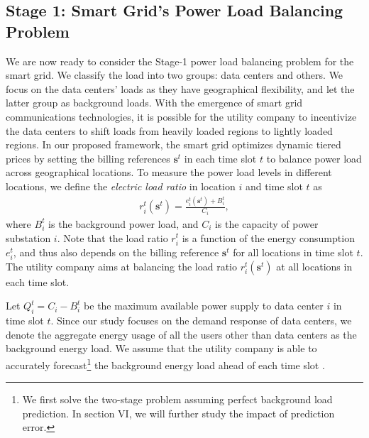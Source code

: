 \documentclass[journal]{IEEEtran}
\begin{document}
	
	
	\subsection{Stage 1: Smart Grid's Power Load Balancing Problem}
	We are now ready to consider the Stage-1 power load balancing problem for the smart grid. We classify the load into two groups: data centers and others. We focus on the data centers' loads as they have geographical flexibility, and let the latter group as background loads. With the emergence of smart grid communications technologies, it is possible for the utility company to incentivize the data centers to shift loads from heavily loaded regions to lightly loaded regions. In our proposed framework, the smart grid optimizes dynamic tiered prices by setting the billing references $\boldsymbol{s}^{t}$ in each time slot $t$ to balance power load across geographical locations. To measure the power load levels in different locations, we define the \emph{electric load ratio} in location $i$ and time slot $t$ as
	\begin{align}\label{loadratio}
		r_{i}^{t}(\boldsymbol{s}^{t}) = \frac{e_{i}^{t}(\boldsymbol{s}^{t}) + B_{i}^{t}} {C_{i}},
	\end{align}
	where $B_{i}^{t}$ is the background power load, and $C_{i}$ is the capacity of power substation $i$. Note that the load ratio $r_{i}^{t}$ is a function of the energy consumption $e_{i}^{t}$, and thus also depends on the billing reference $\boldsymbol{s}^{t}$ for all locations in time slot $t$. The utility company aims at balancing the load ratio $r_{i}^{t}(\boldsymbol{s}^{t})$ at all locations in each time slot.
	
	Let $Q_{i}^{t} = C_{i} - B_{i}^{t}$ be the maximum available power supply to data center $i$ in time slot $t$. Since our study focuses on the demand response of data centers, we denote the aggregate energy usage of all the users other than data centers as the background energy load. We assume that the utility company is able to accurately forecast\footnote{We first solve the two-stage problem assuming perfect background load prediction. In section VI, we will further study the impact of prediction error.} the background energy load ahead of each time slot \cite{predict}.
	
\end{document}
